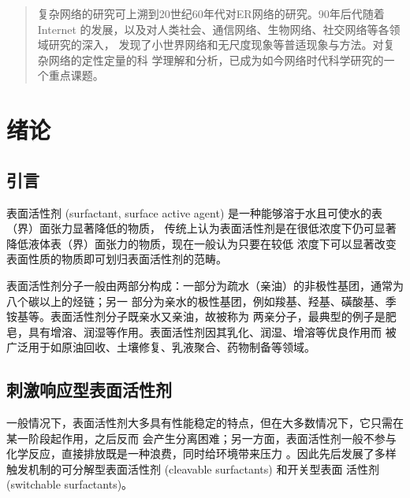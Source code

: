 \documentclass[bachelor,fandolfonts,replaceperiod]{jnuthesis}
\author{陈育明}
\institute{江南大学}
\begin{document}
    \maketitle
    \frontmatter
    \begin{abstract}
        复杂网络的研究可上溯到20世纪60年代对ER网络的研究。90年后代随着Internet
        的发展，以及对人类社会、通信网络、生物网络、社交网络等各领域研究的深入，
        发现了小世界网络和无尺度现象等普适现象与方法。对复杂网络的定性定量的科
        学理解和分析，已成为如今网络时代科学研究的一个重点课题。
    \end{abstract}
    
    \begin{englishabstract}
        \lipsum[1-2]
    \end{englishabstract}
    
    \tableofcontents
    
    \mainmatter
    
    \chapter{绪论}\label{chapter:introduction}
    \section{引言}
    表面活性剂 (surfactant, surface active agent) 是一种能够溶于水且可使水的表（界）面张力显著降低的物质，
    传统上认为表面活性剂是在很低浓度下仍可显著降低液体表（界）面张力的物质，现在一般认为只要在较低
    浓度下可以显著改变表面性质的物质即可划归表面活性剂的范畴。
    
    表面活性剂分子一般由两部分构成：一部分为疏水（亲油）的非极性基团，通常为八个碳以上的烃链；另一
    部分为亲水的极性基团，例如羧基、羟基、磺酸基、季铵基等。表面活性剂分子既亲水又亲油，故被称为
    两亲分子，最典型的例子是肥皂，具有增溶、润湿等作用。表面活性剂因其乳化、润湿、增溶等优良作用而
    被广泛用于如原油回收、土壤修复、乳液聚合、药物制备等领域\cite{秦勇2009}。
    
    \section{刺激响应型表面活性剂}
    一般情况下，表面活性剂大多具有性能稳定的特点，但在大多数情况下，它只需在某一阶段起作用，之后反而
    会产生分离困难；另一方面，表面活性剂一般不参与化学反应，直接排放既是一种浪费，同时给环境带来压力
    \cite{秦勇2009}。因此先后发展了多样触发机制的可分解型表面活性剂 (cleavable surfactants) 和开关型表面
    活性剂 (switchable surfactants)。
    
\end{document}
